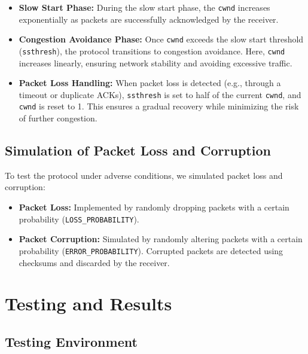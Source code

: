 \documentclass[11pt]{article}
\begin{document}
\begin{itemize}
    \item \textbf{Slow Start Phase:} During the slow start phase, the \texttt{cwnd} increases exponentially as packets are successfully acknowledged by the receiver.
    \item \textbf{Congestion Avoidance Phase:} Once \texttt{cwnd} exceeds the slow start threshold (\texttt{ssthresh}), the protocol transitions to congestion avoidance. Here, \texttt{cwnd} increases linearly, ensuring network stability and avoiding excessive traffic.
    \item \textbf{Packet Loss Handling:} When packet loss is detected (e.g., through a timeout or duplicate ACKs), \texttt{ssthresh} is set to half of the current \texttt{cwnd}, and \texttt{cwnd} is reset to 1. This ensures a gradual recovery while minimizing the risk of further congestion.
\end{itemize}

\subsection{Simulation of Packet Loss and Corruption}

To test the protocol under adverse conditions, we simulated packet loss and corruption:

\begin{itemize}
    \item \textbf{Packet Loss:} Implemented by randomly dropping packets with a certain probability (\texttt{LOSS\_PROBABILITY}).
    \item \textbf{Packet Corruption:} Simulated by randomly altering packets with a certain probability (\texttt{ERROR\_PROBABILITY}). Corrupted packets are detected using checksums and discarded by the receiver.
\end{itemize}

\section{Testing and Results}

\subsection{Testing Environment}
\end{document}
